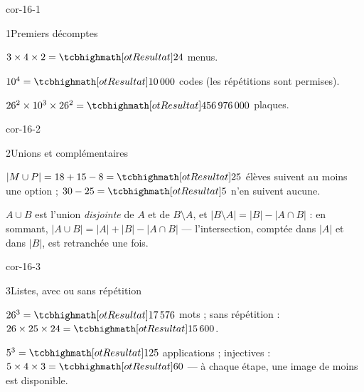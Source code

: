 
\corrigesSouples

\begin{blocLivre}{cor-16-1}
\begin{corrige}{1}{Premiers décomptes}
\begin{questions}
  \item $3\times4\times2=\res{24}$ menus.
  \item $10^{4}=\res{10\,000}$ codes (les répétitions sont permises).
  \item $26^{2}\times10^{3}\times26^{2}=\res{456\,976\,000}$ plaques.
\end{questions}
\end{corrige}
\end{blocLivre}

\begin{blocLivre}{cor-16-2}
\begin{corrige}{2}{Unions et complémentaires}
\begin{questions}
  \item $|M\cup P|=18+15-8=\res{25}$ élèves suivent au moins une option ;
    $30-25=\res{5}$ n'en suivent aucune.
  \item $A\cup B$ est l'union \emph{disjointe} de $A$ et de
    $B\setminus A$, et $|B\setminus A|=|B|-|A\cap B|$ : en sommant,
    $|A\cup B|=|A|+|B|-|A\cap B|$ — l'intersection, comptée dans $|A|$ et
    dans $|B|$, est retranchée une fois.
\end{questions}
\end{corrige}
\end{blocLivre}

\begin{blocLivre}{cor-16-3}
\begin{corrige}{3}{Listes, avec ou sans répétition}
\begin{questions}
  \item $26^{3}=\res{17\,576}$ mots ; sans répétition :
    $26\times25\times24=\res{15\,600}$.
  \item $5^{3}=\res{125}$ applications ; injectives :
    $5\times4\times3=\res{60}$ — à chaque étape, une image de moins est
    disponible.
\end{questions}
\end{corrige}
\end{blocLivre}

